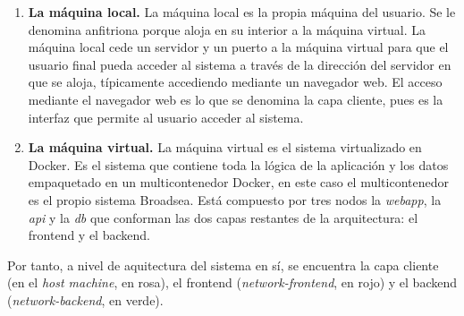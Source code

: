 \begin{enumerate}

    \item \textbf{La máquina local.} La máquina local es la propia máquina del usuario. Se le denomina anfitriona porque aloja en su interior a la máquina virtual. La máquina local cede un servidor y un puerto a la máquina virtual para que el usuario final pueda acceder al sistema a través de la dirección del servidor en que se aloja, típicamente accediendo mediante un navegador web. El acceso mediante el navegador web es lo que se denomina la capa cliente, pues es la interfaz que permite al usuario acceder al sistema. 

    \item \textbf{La máquina virtual.} La máquina virtual es el sistema virtualizado en Docker. Es el sistema que contiene toda la lógica de la aplicación y los datos empaquetado en un multicontenedor Docker, en este caso el multicontenedor es el propio sistema Broadsea. Está compuesto por tres nodos la \textit{webapp}, la \textit{api} y la \textit{db} que conforman las dos capas restantes de la arquitectura: el frontend y el backend.
    
\end{enumerate}

Por tanto, a nivel de aquitectura del sistema en sí, se encuentra la capa cliente (en el \textit{host machine}, en rosa), el frontend (\textit{network-frontend}, en rojo) y el backend (\textit{network-backend}, en verde).

